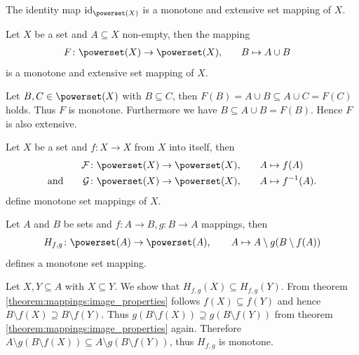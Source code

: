 \begin{examples}
    \begin{exampleenumerate}
        \item The identity map $\idmap_{\powerset(X)}$ is a monotone and extensive set mapping of $X$.
        \item\label{example:mappings:union_monotone_extensive} Let $X$ be a set and $A\subseteq X$ non-empty, then the mapping
        \begin{align}F\colon \powerset(X)\rightarrow\powerset(X),&\qquad B\mapsto A\cup B\end{align}
        is a monotone and extensive set mapping of $X$.
        \begin{miniproof}
            Let $B,C\in\powerset(X)$ with $B\subseteq C$, then $F(B)=A\cup B\subseteq A\cup C=F(C)$ holds. Thus $F$ is monotone. Furthermore we have $B\subseteq A\cup B=F(B)$. Hence $F$ is also extensive.
        \end{miniproof}
        \item Let $X$ be a set and $f\colon X\rightarrow X$ from $X$ into itself, then
        \begin{align}\mathcal F\colon \powerset(X)\rightarrow\powerset(X),&\qquad A\mapsto f(A)\\\text{and}\qquad\mathcal G\colon \powerset(X)\rightarrow\powerset(X),&\qquad A\mapsto f^{-1}(A).\end{align}
        define monotone set mappings of $X$.
        \item\label{example:mappings:cantor_mapping} Let $A$ and $B$ be sets and $f\colon A\rightarrow B,g\colon B\rightarrow A$ mappings, then
        \begin{align}H_{f,g}\colon \powerset(A)\rightarrow\powerset(A),\qquad A\mapsto A\setminus g(B\setminus f(A))\end{align}
        defines a monotone set mapping.
        \begin{miniproof}
            Let $X,Y\subseteq A$ with $X\subseteq Y$. We show that $H_{f,g}(X)\subseteq H_{f,g}(Y)$. From theorem \ref{theorem:mappings:image_properties} follows $f(X)\subseteq f(Y)$ and hence $B\setminus f(X)\supseteq B\setminus f(Y)$. Thus $g(B\setminus f(X))\supseteq g(B\setminus f(Y))$ from theorem \ref{theorem:mappings:image_properties} again. Therefore $A\setminus g(B\setminus f(X))\subseteq A\setminus g(B\setminus f(Y))$, thus $H_{f,g}$ is monotone.
        \end{miniproof}
    \end{exampleenumerate}
\end{examples}

